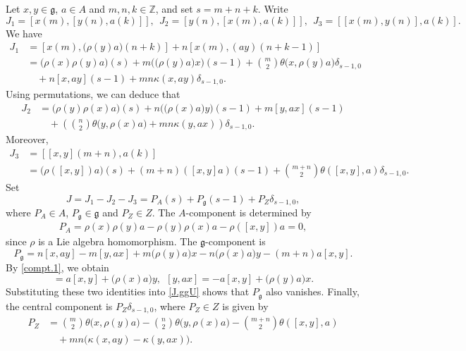 \documentclass[12pt]{article}
\numberwithin{equation}{section}
\theoremstyle{definition}
\theoremstyle{plain}
\newcommand{\bZ}{\ensuremath{\mathbb{Z}}}
\newcommand{\fg}{\mathfrak{g}}
\begin{document}
Let $x,y\in\fg$, $a\in A$ and $m,n,k\in\bZ$, and set $s=m+n+k$. Write
\begin{equation*}
    J_1=[x(m),[y(n),a(k)]],\ \ J_2=[y(n),[x(m),a(k)]],\ \ J_3=[[x(m),y(n)],a(k)].
\end{equation*}
We have
\begin{align*}
    J_1&=[x(m),\big(\rho(y)a\big)(n+k)]+n[x(m),(ay)(n+k-1)]\\
    &=\big(\rho(x)\rho(y)a\big)(s)+m\Big(\big(\rho(y)a\big)x\Big)(s-1)+\binom{m}{2}\theta\big(x,\rho(y)a\big)\delta_{s-1,0}\\
    &\quad+n[x,ay](s-1)+mn\kappa(x,ay)\delta_{s-1,0}.
\end{align*}
Using permutations, we can deduce that
\begin{align*}
    J_2&=\big(\rho(y)\rho(x)a\big)(s)+n\Big(\big(\rho(x)a\big)y\Big)(s-1)+m[y,ax](s-1)\\
    &\quad+\left(\binom{n}{2}\theta\big(y,\rho(x)a\big)+mn\kappa(y,ax)\right)\delta_{s-1,0}.
\end{align*}
Moreover,
\begin{align*}
    J_3&=[[x,y](m+n),a(k)]\\
    &=\big(\rho([x,y])a\big)(s)+(m+n)([x,y]a)(s-1)+\binom{m+n}{2}\theta([x,y],a)\delta_{s-1,0}.
\end{align*}
Set
\begin{equation*}
    J=J_1-J_2-J_3=P_A(s)+P_\fg(s-1)+P_Z\delta_{s-1,0},
\end{equation*}
where $P_A\in A$, $P_\fg\in\fg$ and $P_Z\in Z$. The $A$-component is determined by 
\begin{align*}
    P_A=\rho(x)\rho(y)a-\rho(y)\rho(x)a-\rho([x,y])a=0,
\end{align*}
since $\rho$ is a Lie algebra homomorphism. The $\fg$-component is 
\begin{equation}\label{J.ggU}
    P_\fg=n[x,ay]-m[y,ax]+m\big(\rho(y)a\big)x-n\big(\rho(x)a\big)y-(m+n)a[x,y].
\end{equation}
By \eqref{compt.1}, we obtain
\begin{equation*}
    [x,ay]=a[x,y]+\big(\rho(x)a\big)y,\ \ [y,ax]=-a[x,y]+\big(\rho(y)a\big)x.
\end{equation*}
Substituting these two identities into \eqref{J.ggU} shows that $P_\fg$ also vanishes. Finally, the central component is $P_Z\delta_{s-1,0}$, where $P_Z\in Z$ is given by
\begin{align*}
    P_Z&=\binom{m}{2}\theta\big(x,\rho(y)a\big)-\binom{n}{2}\theta\big(y,\rho(x)a\big)-\binom{m+n}{2}\theta([x,y],a)\\
    &\quad+mn\big(\kappa(x,ay)-\kappa(y,ax)\big).
\end{align*}
\end{document}

